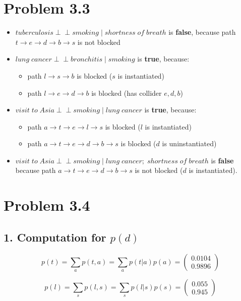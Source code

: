 \documentclass[11pt,a4paper,oneside]{report}
\newcommand\ci{\perp\!\!\!\perp} %
\begin{document}
\section*{Problem 3.3}

\begin{itemize}
 \item $tuberculosis \ci smoking\;|\; shortness\;of\;breath$ is \textbf{false}, 
because path $t \to e \to d \to b \to s$ is not blocked
 \item $lung\;cancer \ci  bronchitis\;|\;smoking$ is \textbf{true}, because:
  \begin{itemize}
    \item path $l \to s \to b$ is blocked ($s$ is instantiated)
    \item path $l \to e \to d \to b$ is blocked (has collider ${e,d,b}$)
  \end{itemize}
 \item $visit \; to \; Asia \ci smoking\;|\;lung\;cancer$ is \textbf{true}, 
because:
   \begin{itemize}
    \item path $a \to t \to e \to l \to s$ is blocked ($l$ is instantiated)
    \item path $a \to t \to e \to d \to b \to s$ is blocked ($d$ is 
uninstantiated)
  \end{itemize}
 \item $visit \; to \; Asia \ci smoking\;|\;lung \; cancer; \; shortness \; of 
\; breath$ is \textbf{false} because path $a \to t \to e \to d \to b \to s$ is 
not blocked ($d$ is instantiated).
\end{itemize}



\section*{Problem 3.4}


\subsection*{1. Computation for $p(d)$}

$$p(t) = \sum_{a}p(t,a) = \sum_{a}p(t|a)p(a) = 
\begin{pmatrix}
   0.0104\\
   0.9896
\end{pmatrix}
$$

$$p(l) = \sum_{s}p(l,s) = \sum_{s}p(l|s)p(s) = 
\begin{pmatrix}
   0.055\\
   0.945
\end{pmatrix}
$$
\end{document}
